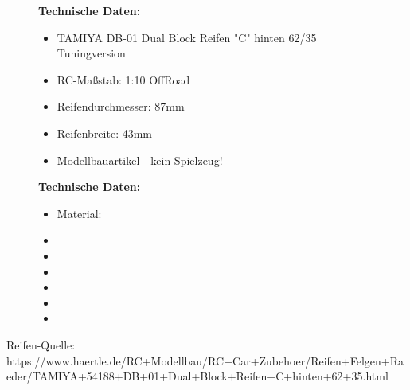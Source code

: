 \begin{figure}[htb]
	\centering
	\begin{minipage}{0.4\linewidth}
		\textbf{Technische Daten:} 
		\begin{itemize} 
			\item TAMIYA DB-01 Dual Block Reifen "C" hinten 62/35 Tuningversion
			\item RC-Maßstab:  1:10 OffRoad
			\item Reifendurchmesser: 87mm
			\item Reifenbreite: 43mm
			\item Modellbauartikel - kein Spielzeug!
		\end{itemize}
	\end{minipage}
	\begin{minipage}[h]{0.4\textwidth}
		\textbf{Technische Daten:} 
		\begin{itemize} 
			\item Material:
			\item 
			\item 
			\item 
			\item 
			\item 
			\item 
		\end{itemize}
	\end{minipage}
\end{figure}
Reifen-Quelle:
https://www.haertle.de/RC+Modellbau/RC+Car+Zubehoer/Reifen+Felgen+Raeder/TAMIYA+54188+DB+01+Dual+Block+Reifen+C+hinten+62+35.html
